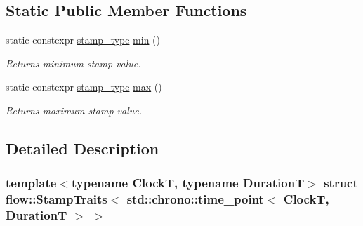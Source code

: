 \subsection*{Static Public Member Functions}
\begin{DoxyCompactItemize}
\item 
\mbox{\label{structflow_1_1_stamp_traits_3_01std_1_1chrono_1_1time__point_3_01_clock_t_00_01_duration_t_01_4_01_4_a70e4576132a0b4ba39ab456bc60b9a20}} 
static constexpr \hyperlink{structflow_1_1_stamp_traits_3_01std_1_1chrono_1_1time__point_3_01_clock_t_00_01_duration_t_01_4_01_4_a06904e1c3115b03be761eba0d6b3e319}{stamp\+\_\+type} \hyperlink{structflow_1_1_stamp_traits_3_01std_1_1chrono_1_1time__point_3_01_clock_t_00_01_duration_t_01_4_01_4_a70e4576132a0b4ba39ab456bc60b9a20}{min} ()
\begin{DoxyCompactList}\small\item\em Returns minimum stamp value. \end{DoxyCompactList}\item 
\mbox{\label{structflow_1_1_stamp_traits_3_01std_1_1chrono_1_1time__point_3_01_clock_t_00_01_duration_t_01_4_01_4_a4f8d6658222ac08191e37f8e506539b7}} 
static constexpr \hyperlink{structflow_1_1_stamp_traits_3_01std_1_1chrono_1_1time__point_3_01_clock_t_00_01_duration_t_01_4_01_4_a06904e1c3115b03be761eba0d6b3e319}{stamp\+\_\+type} \hyperlink{structflow_1_1_stamp_traits_3_01std_1_1chrono_1_1time__point_3_01_clock_t_00_01_duration_t_01_4_01_4_a4f8d6658222ac08191e37f8e506539b7}{max} ()
\begin{DoxyCompactList}\small\item\em Returns maximum stamp value. \end{DoxyCompactList}\end{DoxyCompactItemize}


\subsection{Detailed Description}
\subsubsection*{template$<$typename ClockT, typename DurationT$>$\newline
struct flow\+::\+Stamp\+Traits$<$ std\+::chrono\+::time\+\_\+point$<$ Clock\+T, Duration\+T $>$ $>$}

